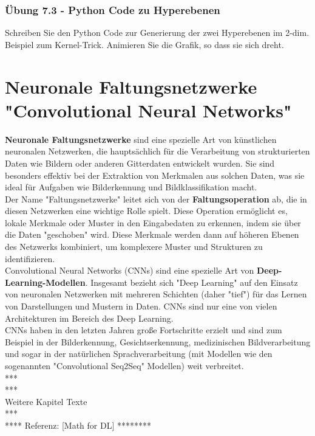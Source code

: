 \documentclass[12pt]{article}
\begin{document}
\subsubsection{Übung 7.3 - Python Code zu Hyperebenen}
Schreiben Sie den Python Code zur Generierung der zwei Hyperebenen im 2-dim. Beispiel zum Kernel-Trick. Animieren Sie die Grafik, so dass sie sich dreht. 

\newpage

\section{Neuronale Faltungsnetzwerke "Convolutional Neural Networks"}

\textbf{Neuronale Faltungsnetzwerke} sind eine spezielle Art von künstlichen neuronalen Netzwerken, die hauptsächlich für die Verarbeitung von strukturierten Daten wie Bildern oder anderen Gitterdaten entwickelt wurden. Sie sind besonders effektiv bei der Extraktion von Merkmalen aus solchen Daten, was sie ideal für Aufgaben wie Bilderkennung und Bildklassifikation macht.
\\
Der Name "Faltungsnetzwerke" leitet sich von der \textbf{Faltungsoperation} ab, die in diesen Netzwerken eine wichtige Rolle spielt. Diese Operation ermöglicht es, lokale Merkmale oder Muster in den Eingabedaten zu erkennen, indem sie über die Daten "geschoben" wird. Diese Merkmale werden dann auf höheren Ebenen des Netzwerks kombiniert, um komplexere Muster und Strukturen zu identifizieren.
\\Convolutional Neural Networks (CNNs) sind eine spezielle Art von \textbf {Deep-Learning-Modellen}. Insgesamt bezieht sich "Deep Learning" auf den Einsatz von neuronalen Netzwerken mit mehreren Schichten (daher "tief") für das Lernen von Darstellungen und Mustern in Daten. CNNs sind nur eine von vielen Architekturen im Bereich des Deep Learning.\\
CNNs haben in den letzten Jahren große Fortschritte erzielt und sind zum Beispiel in der Bilderkennung, Gesichtserkennung, medizinischen Bildverarbeitung und sogar in der natürlichen Sprachverarbeitung (mit Modellen wie den sogenannten "Convolutional Seq2Seq" Modellen) weit verbreitet.\\
***\\
***\\ Weitere Kapitel Texte \\
***\\
**** Referenz: [Math for DL] ******** 
\end{document}
